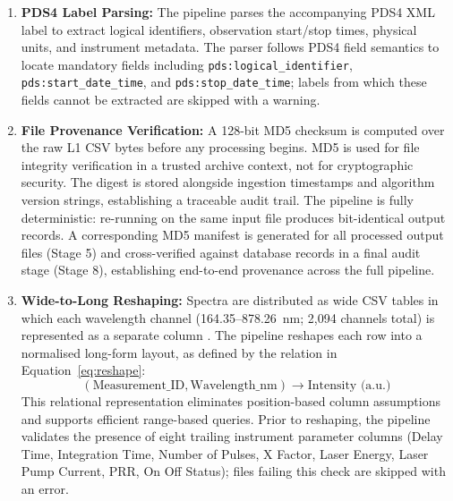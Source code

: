 \documentclass[final,5p,twocolumn,a4paper]{elsarticle}
\begin{document}
\begin{enumerate}
    \item \textbf{PDS4 Label Parsing:} The pipeline parses the accompanying PDS4 XML label to extract logical identifiers, observation start/stop times, physical units, and instrument metadata. The parser follows PDS4 field semantics \cite{pds4_standard} to locate mandatory fields including \texttt{pds:logical\_identifier}, \texttt{pds:start\_date\_time}, and \texttt{pds:stop\_date\_time}; labels from which these fields cannot be extracted are skipped with a warning.
    \item \textbf{File Provenance Verification:} A 128-bit MD5 checksum is computed over the raw L1 CSV bytes before any processing begins. MD5 is used for file integrity verification in a trusted archive context, not for cryptographic security. The digest is stored alongside ingestion timestamps and algorithm version strings, establishing a traceable audit trail. The pipeline is fully deterministic: re-running on the same input file produces bit-identical output records. A corresponding MD5 manifest is generated for all processed output files (Stage 5) and cross-verified against database records in a final audit stage (Stage 8), establishing end-to-end provenance across the full pipeline.
    \item \textbf{Wide-to-Long Reshaping:} Spectra are distributed as wide CSV tables in which each wavelength channel (164.35--878.26~nm; 2,094 channels total) is represented as a separate column \cite{numpy, pandas}. The pipeline reshapes each row into a normalised long-form layout, as defined by the relation in Equation~\eqref{eq:reshape}:
    \begin{equation}
        \label{eq:reshape}
        (\text{Measurement\_ID}, \text{Wavelength\_nm}) \rightarrow \text{Intensity (a.u.)}
    \end{equation}
    This relational representation eliminates position-based column assumptions and supports efficient range-based queries. Prior to reshaping, the pipeline validates the presence of eight trailing instrument parameter columns (Delay Time, Integration Time, Number of Pulses, X Factor, Laser Energy, Laser Pump Current, PRR, On Off Status); files failing this check are skipped with an error.



\end{enumerate}
\end{document}
